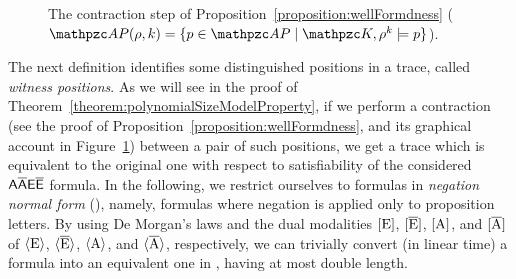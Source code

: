 \begin{figure}[tb]
\centering
    \scalebox{1.8}{
    \begin{tikzpicture}
    	\filldraw [gray] (0,0) circle (2pt)
    	(1.5,0) circle (2pt)
    	(2,0) circle (2pt)
    	(3.5,0) circle (2pt);
    	\filldraw [gray] (0,-0.5) circle (2pt)
    	(1.5,-0.5) circle (2pt)
    	(3,-0.5) circle (2pt);
    	\draw [red] (1.5,0) -- (2,0);
    	\draw [black]  (0,0) -- (1.5,0);
    	\draw [black] (2,0) -- (3.5,0);
    	\draw [black] (0,-0.5) -- (3,-0.5);
    	\draw [dashed, red] (1.5,0) -> (1.5,-0.5);
    	\draw [dashed, red] (2,0) -> (1.5,-0.5);
    	{\tiny
    		\node (a0) at (3.8,0) {$\rho$};	
    		\node (b0) at (4,-0.5) {$\pi\!=\!\rho(1,\! i)\!\star\! \rho^j$};	
    		\node (a1) at (1.4,0.2) {$\rho(i)$};
    		\node (a11) at (1.75,0.2) {$=$};
    		\node (a2) at (2.1,0.2) {$\rho(j)$};
    		\node (a3) at (1.65,0.5) {$\Prop(\rho,\! i)= \Prop(\rho,\! j)$};
    			
    	}
    \end{tikzpicture}}
    \caption{The contraction step of Proposition~\ref{proposition:wellFormdness} ($\Prop(\rho,k)=\{ p \in \Prop \mid \Ku,\rho^{k} \models p\}$).}\label{fig:basicContr}
\end{figure}


The next definition identifies some distinguished positions in a trace, called \emph{witness positions}. As we will see in the proof of Theorem~\ref{theorem:polynomialSizeModelProperty}, if we perform a contraction (see the proof of Proposition~\ref{proposition:wellFormdness}, and its graphical account in Figure~\ref{fig:basicContr}) between a pair of such positions, we get a trace which is equivalent to the original one with respect to satisfiability of the considered $\mathsf{A\overline{A}E\overline{E}}$ formula. In the following, we restrict ourselves to formulas in \emph{negation normal form} (\nnf), namely, formulas where negation is applied only to proposition letters. By using De Morgan's laws and the dual modalities $\operatorname{\mathopen[ E \mathclose]}$, $\operatorname{\mathopen[ \overline{E} \mathclose]}$, $\operatorname{\mathopen[ A \mathclose]}$, and $\operatorname{\mathopen[ \overline{A} \mathclose]}$ of $\operatorname{\langle E\rangle}$, $\operatorname{\langle \overline{E}\rangle}$, $\operatorname{\langle A\rangle}$, and $\operatorname{\langle \overline{A}\rangle}$,  respectively, we can trivially convert (in linear time) a formula into an equivalent one in \nnf, having at most double length.

